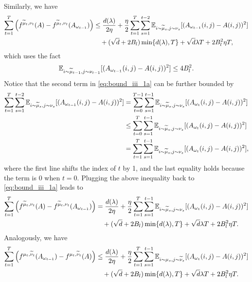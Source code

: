 Similarly, we have  
\begin{align}\label{eq:bound_iii_1a}
     \sum_{t=1}^T \left(f^{\widetilde{\mu}_t,\nu_t}(A)-f^{\widetilde{\mu}_t,\nu_t}(A_{\omega_{t-1}})\right)&\leq \frac{d(\lambda)}{2\eta} +\frac{\eta}{2}\sum_{t=1}^T \sum_{s=1}^{t-2} \mathbb{E}_{i\sim\widetilde{\mu}_s,j\sim\nu_s} [(A_{\omega_{t-1}}(i,j)-A(i,j))^2]  \nonumber \\
    &\quad + (\sqrt{d}+2B_l) \min\{d(\lambda),T\} +\sqrt{d} \lambda T + 2B_l^2\eta T,
 \end{align}
 which uses  the fact  
$$\mathbb{E}_{i\sim\widetilde{\mu}_{t-1},j\sim\nu_{t-1}} [(A_{\omega_{t-1}}(i,j)-A(i,j))^2]\leq 4B_l^2.$$
Notice that the second term in \eqref{eq:bound_iii_1a} can be further bounded by
 \begin{align}   
   \sum_{t=1}^T \sum_{s=1}^{t-2} \mathbb{E}_{i\sim\widetilde{\mu}_s,j\sim\nu_s} [(A_{\omega_{t-1}}(i,j)-A(i,j))^2]   &= \sum_{t=0}^{T-1} \sum_{s=1}^{t-1} \mathbb{E}_{i\sim\widetilde{\mu}_s,j\sim\nu_s} [(A_{\omega_{t}}(i,j)-A(i,j))^2]   \notag\\
    &\leq \sum_{t=0}^{T}  \sum_{s=1}^{t-1} \mathbb{E}_{i\sim\widetilde{\mu}_s,j\sim\nu_s} [(A_{\omega_{t}}(i,j)-A(i,j))^2]  \notag\\
    &= \sum_{t=1}^{T} \sum_{s=1}^{t-1} \mathbb{E}_{i\sim\widetilde{\mu}_s,j\sim\nu_s} [(A_{\omega_{t}}(i,j)-A(i,j))^2] ,
\end{align}
where the first line shifts the index of $t$ by 1, and the last equality holds 
because the term is $0$ when $t=0$. Plugging the above inequality back to \eqref{eq:bound_iii_1a} leads to
\begin{align}\label{eq:bound_iii_1}
     \sum_{t=1}^T \left(f^{\widetilde{\mu}_t,\nu_t}(A)-f^{\widetilde{\mu}_t,\nu_t}(A_{\omega_{t-1}})\right) &= \frac{d(\lambda)}{2\eta} +\frac{\eta}{2}\sum_{t=1}^{T} \sum_{s=1}^{t-1} \mathbb{E}_{i\sim\widetilde{\mu}_s,j\sim\nu_s} [(A_{\omega_{t}}(i,j)-A(i,j))^2] \nonumber \\
   &\quad  + (\sqrt{d}+2B_l) \min\{d(\lambda),T\} +\sqrt{d} \lambda T + 2B_l^2\eta T.
\end{align}
Analogously, we have
\begin{align}\label{eq:bound_iii_2}
    \sum_{t=1}^T \left(f^{\mu_t,\widetilde{\nu}_t}(A_{\omega_{t-1}})-f^{\mu_t,\widetilde{\nu}_t}(A)\right) &\leq \frac{d(\lambda)}{2\eta} +\frac{\eta}{2}\sum_{t=1}^{T} \sum_{s=1}^{t-1} \mathbb{E}_{i\sim\mu_s,j\sim\widetilde{\nu}_s} [(A_{\omega_{t}}(i,j)-A(i,j))^2]  \notag\\
    &\quad  + (\sqrt{d}+2B_l) \min\{d(\lambda),T\} +\sqrt{d} \lambda T + 2B_l^2\eta T.
\end{align}


